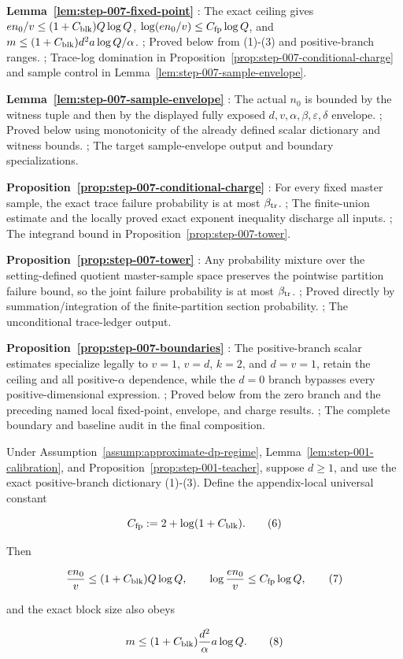 \noindent\textbf{ Lemma~\ref{lem:step-007-fixed-point} }:  The exact ceiling gives \(en_0/v\le(1+C_{\rm blk})Q\log Q\), \(\log(en_0/v)\le C_{\rm fp}\log Q\), and \(m\le(1+C_{\rm blk})d^2a\log Q/\alpha\). ;  Proved below from (1)-(3) and positive-branch ranges. ;  Trace-log domination in Proposition~\ref{prop:step-007-conditional-charge} and sample control in Lemma~\ref{lem:step-007-sample-envelope}. \par
\noindent\textbf{ Lemma~\ref{lem:step-007-sample-envelope} }:  The actual \(n_0\) is bounded by the  witness tuple and then by the displayed fully exposed \(d,v,\alpha,\beta,\varepsilon,\delta\) envelope. ;  Proved below using monotonicity of the already defined scalar dictionary and  witness bounds. ;  The target sample-envelope output and boundary specializations. \par
\noindent\textbf{ Proposition~\ref{prop:step-007-conditional-charge} }:  For every fixed master sample, the exact trace failure probability is at most \(\beta_{\rm tr}\). ;  The  finite-union estimate and the locally proved exact exponent inequality discharge all inputs. ;  The integrand bound in Proposition~\ref{prop:step-007-tower}. \par
\noindent\textbf{ Proposition~\ref{prop:step-007-tower} }:  Any probability mixture over the setting-defined quotient master-sample space preserves the pointwise partition failure bound, so the joint failure probability is at most \(\beta_{\rm tr}\). ;  Proved directly by summation/integration of the finite-partition section probability. ;  The unconditional trace-ledger output. \par
\noindent\textbf{ Proposition~\ref{prop:step-007-boundaries} }:  The positive-branch scalar estimates specialize legally to \(v=1\), \(v=d\), \(k=2\), and \(d=v=1\), retain the ceiling and all positive-\(\alpha\) dependence, while the \(d=0\) branch bypasses every positive-dimensional expression. ;  Proved below from the  zero branch and the preceding named local fixed-point, envelope, and charge results. ;  The complete boundary and baseline audit in the final composition. \par



\begin{lemma}\label{lem:step-007-fixed-point}
Under Assumption~\ref{assump:approximate-dp-regime}, Lemma~\ref{lem:step-001-calibration}, and Proposition~\ref{prop:step-001-teacher}, suppose \(d\ge1\), and use the
exact positive-branch dictionary (1)-(3). Define the appendix-local
universal constant

\[
 C_{\rm fp}:=2+\log(1+C_{\rm blk}).
\tag{6}
\]

Then

\[
 \frac{en_0}{v}\le(1+C_{\rm blk})Q\log Q,
 \qquad
 \log\frac{en_0}{v}\le C_{\rm fp}\log Q,
\tag{7}
\]

and the exact block size also obeys

\[
 m\le(1+C_{\rm blk})
 \frac{d^2}{\alpha}a\log Q.
\tag{8}
\]


\end{lemma}

